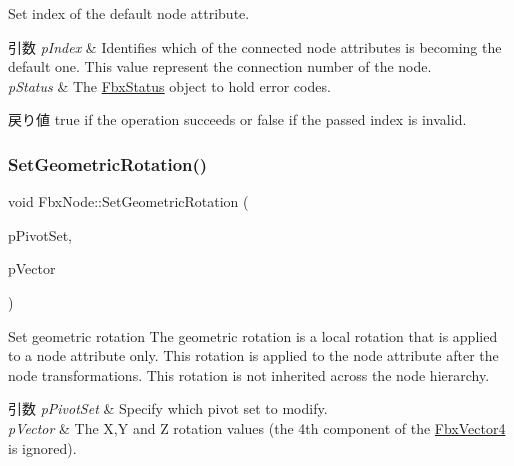 Set index of the default node attribute. 
\begin{DoxyParams}{引数}
{\em p\+Index} & Identifies which of the connected node attributes is becoming the default one. This value represent the connection number of the node. \\
\hline
{\em p\+Status} & The \hyperlink{class_fbx_status}{Fbx\+Status} object to hold error codes. \\
\hline
\end{DoxyParams}
\begin{DoxyReturn}{戻り値}
{\ttfamily true} if the operation succeeds or {\ttfamily false} if the passed index is invalid. 
\end{DoxyReturn}
\mbox{\label{class_fbx_node_a4062b953d36a933a0022343b20f8b522}} 
\subsubsection{\texorpdfstring{Set\+Geometric\+Rotation()}{SetGeometricRotation()}}
{\footnotesize\ttfamily void Fbx\+Node\+::\+Set\+Geometric\+Rotation (\begin{DoxyParamCaption}\item[{\hyperlink{class_fbx_node_ae62b7311ac4727654cdf1ebd5cbf7343}{E\+Pivot\+Set}}]{p\+Pivot\+Set,  }\item[{\hyperlink{class_fbx_vector4}{Fbx\+Vector4}}]{p\+Vector }\end{DoxyParamCaption})}

Set geometric rotation The geometric rotation is a local rotation that is applied to a node attribute only. This rotation is applied to the node attribute after the node transformations. This rotation is not inherited across the node hierarchy. 
\begin{DoxyParams}{引数}
{\em p\+Pivot\+Set} & Specify which pivot set to modify. \\
\hline
{\em p\+Vector} & The X,Y and Z rotation values (the 4th component of the \hyperlink{class_fbx_vector4}{Fbx\+Vector4} is ignored). \\
\hline
\end{DoxyParams}
\mbox{\label{class_fbx_node_aa03076ed567455b364d4fd088fc00fd0}} 
